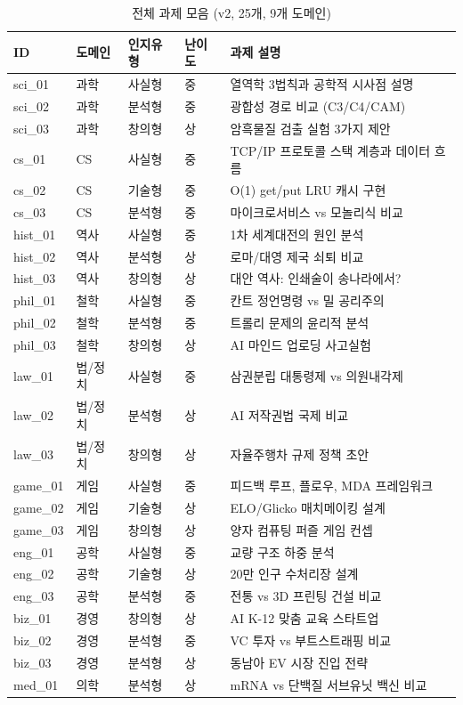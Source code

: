 \documentclass[a4paper,11pt]{article}
\begin{document}
\begin{table}[H]
\centering
\caption{전체 과제 모음 (v2, 25개, 9개 도메인)}
\label{tab:task-suite}
{\footnotesize
\begin{tabular}{lllll}
\toprule
ID & 도메인 & 인지유형 & 난이도 & 과제 설명 \\
\midrule
sci\_01  & 과학    & 사실형 & 중 & 열역학 3법칙과 공학적 시사점 설명 \\
sci\_02  & 과학    & 분석형 & 중 & 광합성 경로 비교 (C3/C4/CAM) \\
sci\_03  & 과학    & 창의형 & 상 & 암흑물질 검출 실험 3가지 제안 \\
cs\_01   & CS      & 사실형 & 중 & TCP/IP 프로토콜 스택 계층과 데이터 흐름 \\
cs\_02   & CS      & 기술형 & 중 & O(1) get/put LRU 캐시 구현 \\
cs\_03   & CS      & 분석형 & 중 & 마이크로서비스 vs 모놀리식 비교 \\
hist\_01 & 역사    & 사실형 & 중 & 1차 세계대전의 원인 분석 \\
hist\_02 & 역사    & 분석형 & 상 & 로마/대영 제국 쇠퇴 비교 \\
hist\_03 & 역사    & 창의형 & 상 & 대안 역사: 인쇄술이 송나라에서? \\
phil\_01 & 철학    & 사실형 & 중 & 칸트 정언명령 vs 밀 공리주의 \\
phil\_02 & 철학    & 분석형 & 중 & 트롤리 문제의 윤리적 분석 \\
phil\_03 & 철학    & 창의형 & 상 & AI 마인드 업로딩 사고실험 \\
law\_01  & 법/정치 & 사실형 & 중 & 삼권분립 대통령제 vs 의원내각제 \\
law\_02  & 법/정치 & 분석형 & 상 & AI 저작권법 국제 비교 \\
law\_03  & 법/정치 & 창의형 & 상 & 자율주행차 규제 정책 초안 \\
game\_01 & 게임    & 사실형 & 중 & 피드백 루프, 플로우, MDA 프레임워크 \\
game\_02 & 게임    & 기술형 & 상 & ELO/Glicko 매치메이킹 설계 \\
game\_03 & 게임    & 창의형 & 상 & 양자 컴퓨팅 퍼즐 게임 컨셉 \\
eng\_01  & 공학    & 사실형 & 중 & 교량 구조 하중 분석 \\
eng\_02  & 공학    & 기술형 & 상 & 20만 인구 수처리장 설계 \\
eng\_03  & 공학    & 분석형 & 중 & 전통 vs 3D 프린팅 건설 비교 \\
biz\_01  & 경영    & 창의형 & 상 & AI K-12 맞춤 교육 스타트업 \\
biz\_02  & 경영    & 분석형 & 중 & VC 투자 vs 부트스트래핑 비교 \\
biz\_03  & 경영    & 분석형 & 상 & 동남아 EV 시장 진입 전략 \\
med\_01  & 의학    & 분석형 & 상 & mRNA vs 단백질 서브유닛 백신 비교 \\
\bottomrule
\end{tabular}
}
\end{table}
\end{document}
